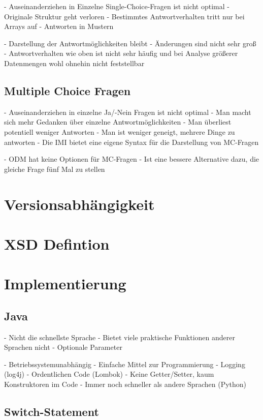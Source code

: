 - Auseinanderziehen in Einzelne Single-Choice-Fragen ist nicht optimal
	- Originale Struktur geht verloren
- Bestimmtes Antwortverhalten tritt nur bei Arrays auf
	- Antworten in Mustern

- Darstellung der Antwortmöglichkeiten bleibt
	- Änderungen sind nicht sehr groß
	- Antwortverhalten wie oben ist nicht sehr häufig und bei Analyse größerer Datenmengen wohl ohnehin nicht feststellbar

\subsection{Multiple Choice Fragen}

- Auseinanderziehen in einzelne Ja/-Nein Fragen ist nicht optimal
	- Man macht sich mehr Gedanken über einzelne Antwortmöglichkeiten
	- Man überliest potentiell weniger Antworten
	- Man ist weniger geneigt, mehrere Dinge zu antworten
- Die IMI bietet eine eigene Syntax für die Darstellung von MC-Fragen

- ODM hat keine Optionen für MC-Fragen
	- Ist eine bessere Alternative dazu, die gleiche Frage fünf Mal zu stellen

\section{Versionsabhängigkeit}

\section{XSD Defintion}

\section{Implementierung}

\subsection{Java}

- Nicht die schnellste Sprache
- Bietet viele praktische Funktionen anderer Sprachen nicht
	- Optionale Parameter

- Betriebssystemunabhängig
- Einfache Mittel zur Programmierung
	- Logging (log4j)
	- Ordentlichen Code (Lombok)
		- Keine Getter/Setter, kaum Konstruktoren im Code
- Immer noch schneller als andere Sprachen (Python)

\subsection{Switch-Statement}

